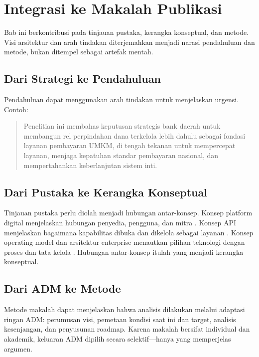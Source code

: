 \section{Integrasi ke Makalah Publikasi}

Bab ini berkontribusi pada tinjauan pustaka, kerangka konseptual, dan metode.
Visi arsitektur dan arah tindakan diterjemahkan menjadi narasi pendahuluan dan
metode, bukan ditempel sebagai artefak mentah.

\subsection{Dari Strategi ke Pendahuluan}

Pendahuluan dapat menggunakan arah tindakan untuk menjelaskan urgensi. Contoh:

\begin{quote}
Penelitian ini membahas keputusan strategis bank daerah untuk membangun rel
perpindahan dana terkelola lebih dahulu sebagai fondasi layanan pembayaran
UMKM, di tengah tekanan untuk mempercepat layanan, menjaga kepatuhan standar
pembayaran nasional, dan mempertahankan keberlanjutan sistem inti.
\end{quote}

\subsection{Dari Pustaka ke Kerangka Konseptual}

Tinjauan pustaka perlu diolah menjadi hubungan antar-konsep. Konsep platform
digital menjelaskan hubungan penyedia, pengguna, dan mitra
\cite{parker2016platform,cusumano2019business}. Konsep API menjelaskan
bagaimana kapabilitas dibuka dan dikelola sebagai layanan
\cite{jacobson2011apis,medjaoui2018continuous}. Konsep operating model dan
arsitektur enterprise menautkan pilihan teknologi dengan proses dan tata kelola
\cite{ross2006enterprise,ross2019designed}. Hubungan antar-konsep itulah yang
menjadi kerangka konseptual.

\subsection{Dari ADM ke Metode}

Metode makalah dapat menjelaskan bahwa analisis dilakukan melalui adaptasi
ringan ADM: perumusan visi, pemetaan kondisi saat ini dan target, analisis
kesenjangan, dan penyusunan roadmap. Karena makalah bersifat individual dan
akademik, keluaran ADM dipilih secara selektif---hanya yang memperjelas argumen.

